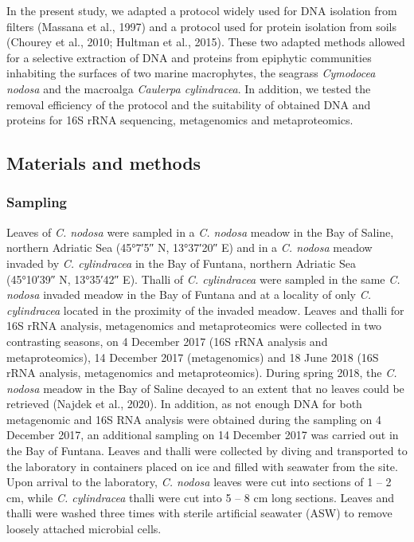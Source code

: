\documentclass[12pt,]{article}
\begin{document}
In the present study, we adapted a protocol widely used for DNA
isolation from filters (Massana et al., 1997) and a protocol used for
protein isolation from soils (Chourey et al., 2010; Hultman et al.,
2015). These two adapted methods allowed for a selective extraction of
DNA and proteins from epiphytic communities inhabiting the surfaces of
two marine macrophytes, the seagrass \emph{Cymodocea nodosa} and the
macroalga \emph{Caulerpa cylindracea}. In addition, we tested the
removal efficiency of the protocol and the suitability of obtained DNA
and proteins for 16S rRNA sequencing, metagenomics and metaproteomics.

\newpage

\hypertarget{materials-and-methods}{%
\subsection{Materials and methods}\label{materials-and-methods}}

\hypertarget{sampling}{%
\subsubsection{Sampling}\label{sampling}}

Leaves of \emph{C. nodosa} were sampled in a \emph{C. nodosa} meadow in
the Bay of Saline, northern Adriatic Sea (\ang{45;7;5} N, \ang{13;37;20}
E) and in a \emph{C. nodosa} meadow invaded by \emph{C. cylindracea} in
the Bay of Funtana, northern Adriatic Sea (\ang{45;10;39} N,
\ang{13;35;42} E). Thalli of \emph{C. cylindracea} were sampled in the
same \emph{C. nodosa} invaded meadow in the Bay of Funtana and at a
locality of only \emph{C. cylindracea} located in the proximity of the
invaded meadow. Leaves and thalli for 16S rRNA analysis, metagenomics
and metaproteomics were collected in two contrasting seasons, on 4
December 2017 (16S rRNA analysis and metaproteomics), 14 December 2017
(metagenomics) and 18 June 2018 (16S rRNA analysis, metagenomics and
metaproteomics). During spring 2018, the \emph{C. nodosa} meadow in the
Bay of Saline decayed to an extent that no leaves could be retrieved
(Najdek et al., 2020). In addition, as not enough DNA for both
metagenomic and 16S RNA analysis were obtained during the sampling on 4
December 2017, an additional sampling on 14 December 2017 was carried
out in the Bay of Funtana. Leaves and thalli were collected by diving
and transported to the laboratory in containers placed on ice and filled
with seawater from the site. Upon arrival to the laboratory, \emph{C.
nodosa} leaves were cut into sections of 1 -- 2 \si{\cm}, while \emph{C.
cylindracea} thalli were cut into 5 -- 8 \si{\cm} long sections. Leaves
and thalli were washed three times with sterile artificial seawater
(ASW) to remove loosely attached microbial cells.
\end{document}
